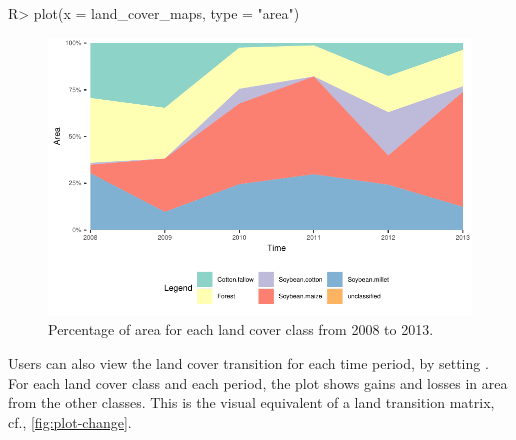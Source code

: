 \documentclass[article,shortnames]{jss}
\begin{document}
\begin{CodeChunk}

\begin{CodeInput}
R> plot(x = land_cover_maps, type = "area")
\end{CodeInput}
\begin{figure}[!h]

{\centering \includegraphics{dtwSat_files/figure-latex/plot-area-1} 

}

\caption[Percentage of area for each land cover class from 2008 to 2013]{Percentage of area for each land cover class from 2008 to 2013.}\label{fig:plot-area}
\end{figure}
\end{CodeChunk}

Users can also view the land cover transition for each time period, by
setting . For each land cover class and each
period, the plot shows gains and losses in area from the other classes.
This is the visual equivalent of a land transition matrix, cf.,
\autoref{fig:plot-change}.
\end{document}
